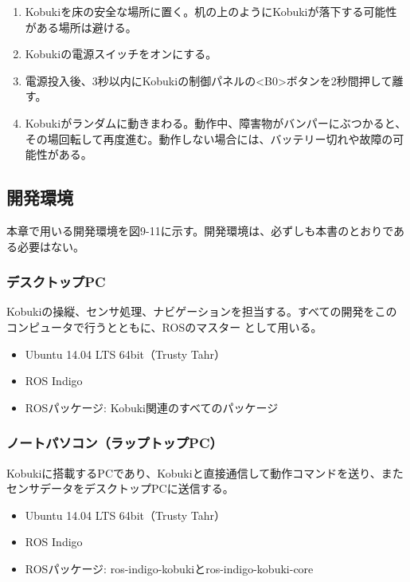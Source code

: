\begin{enumerate}
\item Kobukiを床の安全な場所に置く。机の上のようにKobukiが落下する可能性がある場所は避ける。
\item Kobukiの電源スイッチをオンにする。
\item 電源投入後、3秒以内にKobukiの制御パネルの<B0>ボタンを2秒間押して離す。
\item Kobukiがランダムに動きまわる。動作中、障害物がバンパーにぶつかると、その場回転して再度進む。動作しない場合には、バッテリー切れや故障の可能性がある。
\end{enumerate}

\subsection{開発環境}

本章で用いる開発環境を図9-11に示す。開発環境は、必ずしも本書のとおりである必要はない。

\subsubsection{デスクトップPC}

Kobukiの操縦、センサ処理、ナビゲーションを担当する。すべての開発をこのコンピュータで行うとともに、ROSのマスター   として用いる。

\begin{itemize}
\item Ubuntu 14.04 LTS 64bit（Trusty Tahr）
\item ROS Indigo
\item ROSパッケージ: Kobuki関連のすべてのパッケージ
\end{itemize}

\subsubsection{ノートパソコン（ラップトップPC）}

Kobukiに搭載するPCであり、Kobukiと直接通信して動作コマンドを送り、またセンサデータをデスクトップPCに送信する。
\begin{itemize}
\item Ubuntu 14.04 LTS 64bit（Trusty Tahr）
\item ROS Indigo
\item ROSパッケージ: ros-indigo-kobukiとros-indigo-kobuki-core
\end{itemize}

